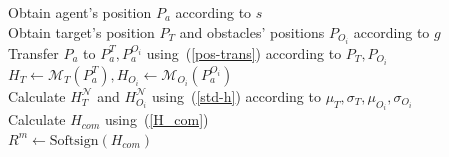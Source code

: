 \documentclass[journal]{IEEEtran}
\begin{document}
\begin{algorithm}[tb]
\caption{Magnetic reward function}
\label{srf-mfrs}


Obtain agent's position $P_a$ according to $s$ \\
Obtain target's position $P_T$ and obstacles' positions $P_{O_i}$ according to $g$ \\

Transfer $P_a$ to $P_a^T, P_a^{O_i}$ using~(\ref{pos-trans}) according to $P_T, P_{O_i}$\\
$H_{T}\leftarrow \mathcal{M}_{T}(P_{a}^{T}), H_{O_i}\leftarrow \mathcal{M}_{O_i}(P_{a}^{O_i})$ \\
Calculate $H_{T}^{\mathcal{N}}$ and $H_{O_i}^{\mathcal{N}}$ using~(\ref{std-h}) according to $\mu_T, \sigma_T, \mu_{O_i}, \sigma_{O_i}$ \\
Calculate $H_{com}$ using~(\ref{H_com}) \\
$R^{m} \leftarrow \text{Softsign}(H_{com})$
\end{algorithm}
\end{document}
